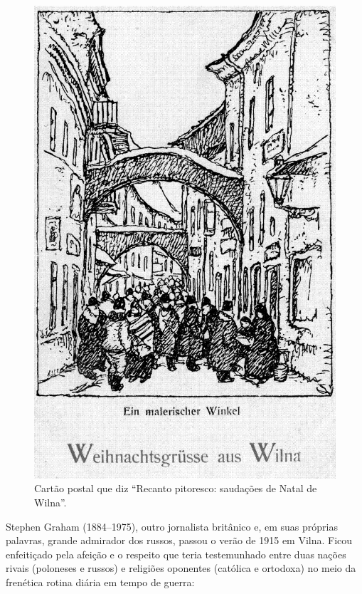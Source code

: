 
\begin{figure}[!hp]
    \centering
    \includegraphics[width=\textwidth]{ilustra-08.png}
    \caption{Cartão postal que diz ``Recanto pitoresco: saudações de Natal de Wilna''.}
\end{figure}

Stephen Graham (1884--1975), outro jornalista britânico e, em suas
próprias palavras, grande admirador dos russos, passou o verão de 1915
em Vilna. Ficou enfeitiçado pela afeição e o respeito que teria
testemunhado entre duas nações rivais (poloneses e russos) e religiões
oponentes (católica e ortodoxa) no meio da frenética rotina diária em
tempo de guerra:


